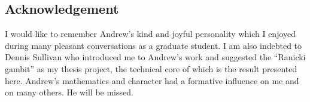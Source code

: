 
\subsection*{Acknowledgement}

I would like to remember Andrew's kind and joyful personality which I enjoyed during many pleasant conversations as a graduate student.
I am also indebted to Dennis Sullivan who introduced me to Andrew's work and suggested the ``Ranicki gambit'' as my thesis project, the technical core of which is the result presented here.
Andrew's mathematics and character had a formative influence on me and on many others.
He will be missed.